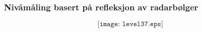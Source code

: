 \documentclass[aspectratio=169,xcolor=dvipsnames]{beamer}
\begin{document}
%
%
%
%
%
%
%
%
%
%
%
%
%
%
%
\begin{frame}
	\frametitle{Nivåmåling basert på refleksjon av radarbølger}

$$\texttt{[image: level37.eps]}$$
\end{frame}
%
%
\end{document}
